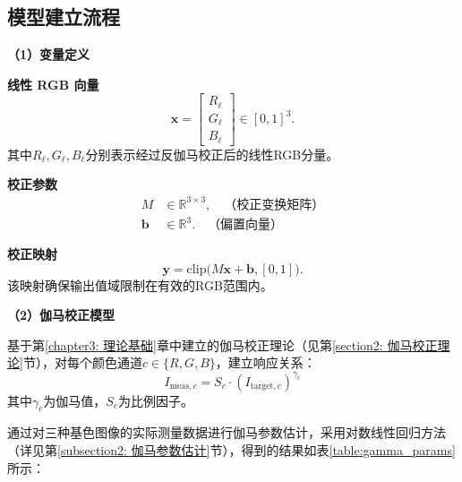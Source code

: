 \subsection[\hspace{-2pt}模型建立流程]{{\heiti{}\hspace{-8pt}模型建立流程}}\label{subsec:3-model-build}

\noindent \textbf{（1）变量定义}

 \textbf{线性 RGB 向量}
\begin{equation}
  \mathbf{x}=\begin{bmatrix}R_\ell\\G_\ell\\B_\ell\end{bmatrix}\in[0,1]^3.
\end{equation}
其中$R_\ell, G_\ell, B_\ell$分别表示经过反伽马校正后的线性RGB分量。

 \textbf{校正参数}
\begin{align}
  M &\in\mathbb{R}^{3\times3}, \quad \text{（校正变换矩阵）}\\
  \mathbf{b} &\in\mathbb{R}^3. \quad \text{（偏置向量）}
\end{align}

 \textbf{校正映射}
\begin{equation}
  \mathbf{y}=\mathrm{clip}\!\bigl(M\mathbf{x}+\mathbf{b},[0,1]\bigr).
\end{equation}
该映射确保输出值域限制在有效的RGB范围内。

\noindent\textbf{（2）伽马校正模型}

基于第\ref{chapter3: 理论基础}章中建立的伽马校正理论（见第\ref{section2: 伽马校正理论}节），对每个颜色通道$c \in \{R,G,B\}$，建立响应关系\cite{gamma_correction,poynton2012digital}：
\begin{equation}
  I_{\text{meas},c} = S_c \cdot (I_{\text{target},c})^{\gamma_c}
\end{equation}
其中$\gamma_c$为伽马值，$S_c$为比例因子。

通过对三种基色图像的实际测量数据进行伽马参数估计，采用对数线性回归方法（详见第\ref{subsection2: 伽马参数估计}节），得到的结果如表\ref{table:gamma_params}所示：

